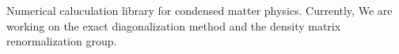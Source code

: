 Numerical caluculation library for condensed matter physics. Currently, We are working on the exact diagonalization method and the density matrix renormalization group. 